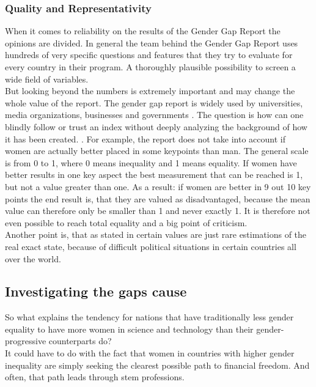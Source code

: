 	\subsubsection{Quality and Representativity}
	When it comes to reliability on the results of the Gender Gap Report the opinions are divided. In general the team behind the Gender Gap Report uses hundreds of very specific questions and features that they try to evaluate for every country in their program. A thoroughly plausible possibility to screen a wide field of variables.\\
	\newline
	But looking beyond the numbers is extremely important and may change the whole value of the report. The gender gap report is widely used by universities, media organizations, businesses and governments \cite{tgender}. The question is how can one blindly follow or trust an index without deeply analyzing the background of how it has been created. \cite{tagainstgender}. For example, the report does not take into account if women are actually better placed in some keypoints than man. The general scale is from 0 to 1, where 0 means inequality and 1 means equality. If women have better results in one key aspect the best measurement that can be reached is 1, but not a value greater than one. As a result: if women are better in 9 out 10 key points the end result is, that they are valued as disadvantaged, because the mean value can therefore only be smaller than 1 and never exactly 1. It is therefore not even possible to reach total equality and a big point of criticism. \cite{tgenderPaper}\\
	\newline
	Another point is, that as stated in \cite{tgenderPaper} certain values are just rare estimations of the real exact state, because of difficult political situations in certain countries all over the world.
	
	\subsection{Investigating the gaps cause}
	So what explains the tendency for nations that have traditionally less gender equality to have more women in science and technology than their gender-progressive counterparts do?\\
		
	It could have to do with the fact that women in countries with higher gender inequality are simply seeking the clearest possible path to financial freedom. And often, that path leads through stem professions.
	
